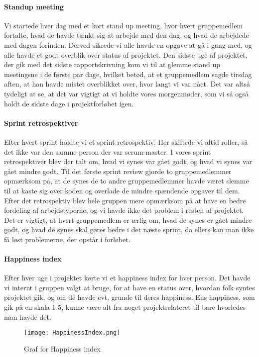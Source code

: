\paragraph*{Standup meeting}
Vi startede hver dag med et kort stand up meeting, hvor hvert gruppemedlem fortalte, hvad de havde tænkt sig at arbejde med den dag, og hvad de arbejdede med dagen forinden.
Derved sikrede vi alle havde en opgave at gå i gang med, og alle havde et godt overblik over status af projektet.
Den sidste uge af projektet, der gik med det sidste rapportskrivning kom vi til at glemme stand up meetingsne i de første par dage, hvilket betød, at et gruppemedlem sagde tirsdag aften, at han havde mistet overblikket over, hvor langt vi var nået.
Det var altså tydeligt at se, at det var vigtigt at vi holdte vores morgenmøder, som vi så også holdt de sidste dage i projektforløbet igen.

\paragraph*{Sprint retrospektiver}
Efter hvert sprint holdte vi et sprint retrospektiv. Her skiftede vi altid roller, så det ikke var den samme person der var scrum-master.
I vores sprint retrospektiver blev der talt om, hvad vi synes var gået godt, og hvad vi synes var gået mindre godt.
Til det første sprint review gjorde to gruppemedlemmer opmærksom på, at de synes de to andre gruppemedlemmer havde været slemme til at kaste sig over koden og overlade de mindre spændende opgaver til dem.
Efter det retrospektiv blev hele gruppen mere opmærksom på at have en bedre fordeling af arbejdstyperne, og vi havde ikke det problem i resten af projektet.
Det er vigtigt, at hvert gruppemedlem er ærlig om, hvad de synes er gået mindre godt, og hvad de synes skal gøres bedre i det næste sprint, da ellers kan man ikke få løst problemerne, der opstår i forløbet.

\paragraph*{Happiness index}
Efter hver uge i projektet kørte vi et happiness index for hver person.
Det havde vi internt i gruppen valgt at bruge, for at have en status over, hvordan folk syntes projektet gik, og om de havde evt. grunde til deres happiness.
Ens happiness, som gik på en skala 1-5, kunne være alt fra noget projektrelateret til bare hvorledes man havde det.

\begin{figure}[h]
    \caption{Graf for Happiness index}
    \centering
        \texttt{[image: HappinessIndex.png]}
    \label{happinessindex}
\end{figure}

